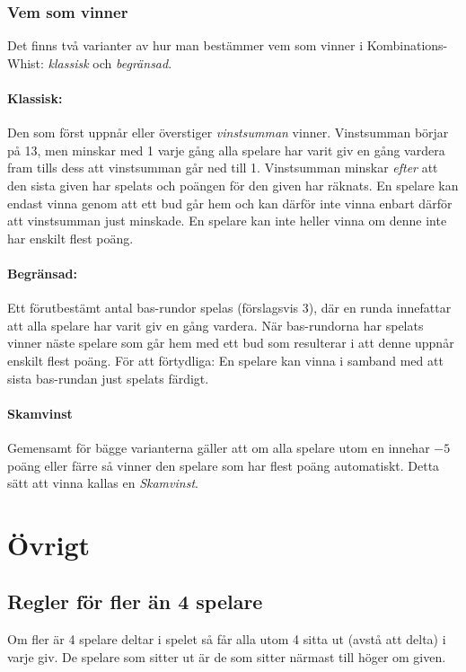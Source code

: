 \documentclass[a4paper]{article}
\begin{document}
			\subsubsection{Vem som vinner}
				\label{sec:winning}
				Det finns två varianter av hur man bestämmer vem som vinner i Kombinations-Whist: \emph{klassisk} och \emph{begränsad}.

				\paragraph{Klassisk:}
					Den som först uppnår eller överstiger \emph{vinstsumman} vinner. Vinstsumman börjar på 13, men minskar med 1 varje gång alla spelare har varit giv en gång vardera fram tills dess att vinstsumman går ned till 1. Vinstsumman minskar \emph{efter} att den sista given har spelats och poängen för den given har räknats. En spelare kan endast vinna genom att ett bud går hem och kan därför inte vinna enbart därför att vinstsumman just minskade. En spelare kan inte heller vinna om denne inte har enskilt flest poäng.

				\paragraph{Begränsad:}
					Ett förutbestämt antal bas-rundor spelas (förslagsvis 3), där en runda innefattar att alla spelare har varit giv en gång vardera. När bas-rundorna har spelats vinner näste spelare som går hem med ett bud som resulterar i att denne uppnår enskilt flest poäng. För att förtydliga: En spelare kan vinna i samband med att sista bas-rundan just spelats färdigt.

				\paragraph{Skamvinst} Gemensamt för bägge varianterna gäller att om alla spelare utom en innehar $-5$ poäng eller färre så vinner den spelare som har flest poäng automatiskt. Detta sätt att vinna kallas en \emph{Skamvinst}.

	\section{Övrigt}
		\subsection{Regler för fler än 4 spelare}
			Om fler är 4 spelare deltar i spelet så får alla utom 4 sitta ut (avstå att delta) i varje giv. De spelare som sitter ut är de som sitter närmast till höger om given.
		
\end{document}
